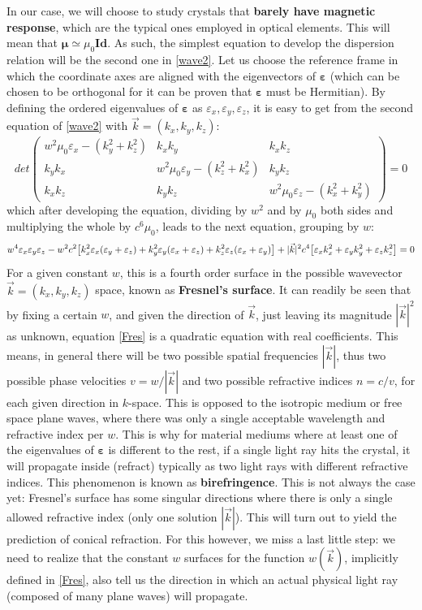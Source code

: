 \documentclass[11pt, a4paper, twoside]{article} %
\begin{document}
In our case, we will choose to study crystals that {\bf barely have magnetic response}, which are the typical ones employed in optical elements. This will mean that $\pmb{\mu}\simeq \mu_0\pmb{Id}$. As such, the simplest equation to develop the dispersion relation will be the second one in \eqref{wave2}. Let us choose the reference frame in which the coordinate axes are aligned with the eigenvectors of $\pmb{\varepsilon}$ (which can be chosen to be orthogonal for it can be proven that $\pmb{\varepsilon}$ must be Hermitian). By defining the ordered eigenvalues of $\pmb{\varepsilon}$ as $\varepsilon_x, \varepsilon_y, \varepsilon_z$, it is easy to get from the second equation of \eqref{wave2} with $\vec{k}=(k_x,k_y,k_z)$:
\begin{equation}
det\begin{pmatrix}
w^2\mu_0\varepsilon_x-(k_y^2+k_z^2) & k_xk_y & k_xk_z\\
k_yk_x & w^2\mu_0\varepsilon_y-(k_z^2+k_x^2) & k_yk_z\\
k_xk_z & k_yk_z & w^2\mu_0\varepsilon_z-(k_x^2+k_y^2)
\end{pmatrix}=0
\end{equation}
which after developing the equation, dividing by $w^2$ and by $\mu_0$ both sides and multiplying the whole by $c^6\mu_0$, leads to the next equation, grouping by $w$:
\begin{equation}\label{Fres}
w^4\varepsilon_x\varepsilon_y\varepsilon_z-w^2c^2\qty[k_x^2\varepsilon_x(\varepsilon_y+\varepsilon_z)+k_y^2\varepsilon_y(\varepsilon_x+\varepsilon_z)+k_z^2\varepsilon_z(\varepsilon_x+\varepsilon_y) ]+|\vec{k}|^2c^4\qty[\varepsilon_xk_x^2+\varepsilon_yk_y^2+\varepsilon_zk_z^2]=0
\end{equation}
For a given constant $w$, this is a fourth order surface in the possible wavevector $\vec{k}=(k_x,k_y,k_z)$ space, known as {\bf Fresnel's surface}. It can readily be seen that by fixing a certain $w$, and given the direction of $\vec{k}$, just leaving its magnitude $|\vec{k}|^2$ as unknown, equation \eqref{Fres} is a quadratic equation with real coefficients. This means, in general there will be two possible spatial frequencies $|\vec{k}|$, thus two possible phase velocities $v=w/|\vec{k}|$ and two possible refractive indices $n=c/v$, for each given direction in $k$-space. This is opposed to the isotropic medium or free space plane waves, where there was only a single acceptable wavelength and refractive index per $w$. This is why for material mediums where at least one of the eigenvalues of $\pmb{\varepsilon}$ is different to the rest, if a single light ray hits the crystal, it will propagate inside (refract) typically as two light rays with different refractive indices. This phenomenon is known as {\bf birefringence}. This is not always the case yet: Fresnel's surface has some singular directions where there is only a single allowed refractive index (only one solution $|\vec{k}|$). This will turn out to yield the prediction of conical refraction. For this however, we miss a last little step: we need to realize that the constant $w$ surfaces for the function $w(\vec{k})$, implicitly defined in \eqref{Fres}, also tell us the direction in which an actual physical light ray (composed of many plane waves) will propagate.
\end{document}
